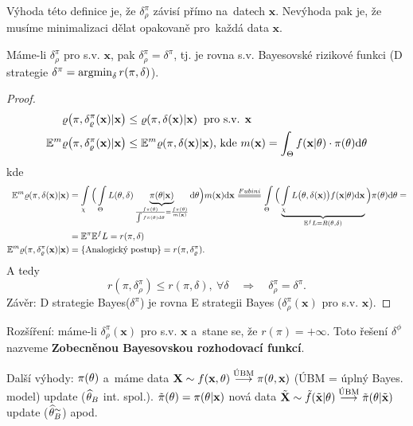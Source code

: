 \begin{remark}
	Výhoda této definice je, že $\delta_\rho^\pi$ závisí přímo na~datech $\textbf{x}$. Nevýhoda pak je, že musíme minimalizaci dělat opakovaně pro~každá data $\textbf{x}$.
\end{remark}
\begin{theorem}
	Máme-li $\delta_\rho^\pi$ pro s.v. $\textbf{x}$, pak $\delta_\rho^\pi=\delta^\pi$, tj. je rovna s.v. Bayesovské rizikové funkci (D strategie $\delta^\pi=\mathop{\mathrm{argmin}}_\delta r(\pi,\delta)$).
	\begin{proof}
		\[
		\begin{split}
		\varrho\big(\pi,\delta_\varrho^\pi(\textbf{x})|\textbf{x}\big)&\leq \varrho(\pi,\delta(\textbf{x})|\textbf{x}) \hspace{0.2cm} \text{pro s.v. } \textbf{x} \\
		\mathbb{E}^m\varrho\big(\pi,\delta_\varrho^\pi(\textbf{x})|\textbf{x}\big)&\leq \mathbb{E}^m\varrho(\pi,\delta(\textbf{x})|\textbf{x})\text{, kde } m(\textbf{x})=\int_{\Theta}f(\textbf{x}|\theta)\cdot \pi(\theta)\mathrm{d}\theta
		\end{split}
		\]
		kde
		\[
		\begin{split}
		\E^m\rho(\pi,\delta(\textbf{x})|\textbf{x})&=\int\limits_{\chi}\Big( \int\limits_{\Theta} L(\t,\delta)\underbrace{\pi(\t|\textbf{x})}_{\frac{f\pi(\t)}{\int f\pi(\t)\d\t}=\frac{f\pi(\t)}{m(\textbf{x})}}\d\t\Big)m(\textbf{x})\d\textbf{x}\equal{Fubini}\int\limits_{\Theta}\Big( \underbrace{\int\limits_{\chi} L\big(\t,\delta(\textbf{x})\big)f(\textbf{x}|\t)\d\textbf{x}}_{\E^f L=R(\t,\delta)} \Big)\pi(\t)\d\t=\\&=\E^\pi\E^f L=r(\pi,\delta) \\
		\E^m\rho(\pi,\delta_\rho^\pi(\textbf{x})|\textbf{x})&=\{\text{Analogický postup}\}=r(\pi,\delta_\rho^\pi).
		\end{split}
		\]
		A tedy 
		$$ r(\pi,\delta_\rho^\pi)\leq r(\pi,\delta),~\forall\delta\quad \Rightarrow\quad \delta_\rho^\pi=\delta^\pi.$$
		Závěr: D strategie Bayes($\delta^\pi$) je rovna E strategii Bayes ($\delta_\rho^\pi(\textbf{x})$ pro s.v. $\textbf{x}$).
	\end{proof} 
\end{theorem}
Rozšíření: máme-li $\delta_\rho^\pi(\textbf{x})$ pro s.v. $\textbf{x}$ a~stane se, že $r(\pi)=+\infty$. Toto řešení $\delta^{\phi}$ nazveme \textbf{Zobecněnou Bayesovskou rozhodovací funkcí}.

Další výhody: $\pi(\theta)$ a~máme data $\textbf{X}\sim f(\textbf{x},\theta)\stackrel{\text{ÚBM}}{\longrightarrow}\pi(\theta,\textbf{x})$ (ÚBM = úplný Bayes. model) update ($\widehat{\theta}_B$ int. spol.). $\tilde{\pi}(\theta)=\pi(\theta|\textbf{x})$ nová data $\tilde{\textbf{X}}\sim\tilde{f}(\tilde{\textbf{x}}|\theta)\stackrel{\text{ÚBM}}{\longrightarrow}\tilde{\pi}(\theta|\tilde{\textbf{x}})$ update ($\widehat{\theta}_B^{\sim}$) apod. 

